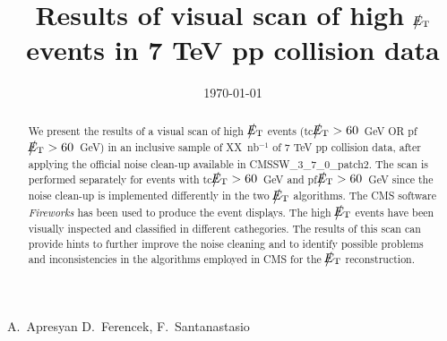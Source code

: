 \documentclass{cmspaper}
\def\etmiss{\big\slash\hspace{-1.6ex}{E_\text{T}}}
\begin{document}
\begin{linenumbers}


\begin{titlepage}


   \date{\today}

  \title{Results of visual scan of high $\etmiss$ events in 7 TeV pp collision data}

  \begin{Authlist}
    A.~Apresyan
    D.~Ferencek, F.~Santanastasio %
  \end{Authlist}



  \begin{abstract}    
   We present the results of a visual scan of high $\etmiss$ events 
   (tc$\etmiss>60$~GeV OR pf$\etmiss>60$~GeV)
   in an inclusive sample of XX~nb$^{-1}$ of 7 TeV pp collision data, 
   after applying the official noise clean-up available in CMSSW\_3\_7\_0\_patch2. 
   The scan is performed separately for events with tc$\etmiss>60$~GeV and pf$\etmiss>60$~GeV
   since the noise clean-up is implemented differently in the two $\etmiss$ algorithms.
   The CMS software {\it Fireworks} has been used to produce the event displays. 
   The high $\etmiss$ events have been visually inspected and classified in different 
   cathegories. The results of this scan can provide hints to further improve the noise 
   cleaning and to identify possible problems and inconsistencies in the algorithms employed 
   in CMS for the $\etmiss$ reconstruction.
  \end{abstract} 

  
\end{titlepage}

\setcounter{page}{2}%

\tableofcontents

\clearpage





\clearpage

%


\end{linenumbers}
\end{document}
